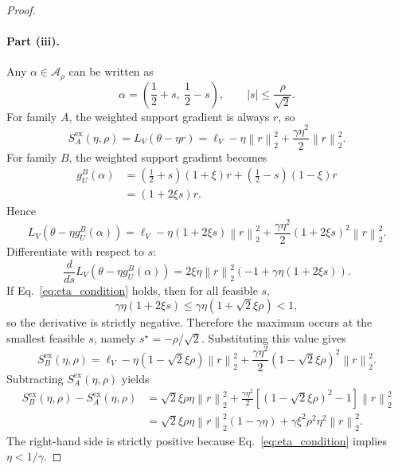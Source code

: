 \documentclass{article}
\newcommand{\norm}[1]{\left\lVert #1 \right\rVert}
\begin{document}
\begin{proof}
\paragraph{Part (iii).}
Any $\alpha \in \mathcal{A}_{\rho}$ can be written as
\begin{equation}
    \alpha = \left(\frac{1}{2}+s,\ \frac{1}{2}-s\right),
    \qquad
    |s| \le \frac{\rho}{\sqrt{2}}.
\end{equation}
For family $A$, the weighted support gradient is always $r$, so
\begin{equation}
    S_A^{\mathrm{ex}}(\eta,\rho)
    =
    L_V(\theta - \eta r)
    =
    \ell_V - \eta \norm{r}_2^2 + \frac{\gamma \eta^2}{2}\norm{r}_2^2.
\end{equation}
For family $B$, the weighted support gradient becomes
\begin{align}
    g_U^B(\alpha)
    &=
    \left(\frac{1}{2}+s\right)(1+\xi)r + \left(\frac{1}{2}-s\right)(1-\xi)r \\
    &=
    (1+2\xi s)r.
\end{align}
Hence
\begin{equation}
    L_V(\theta - \eta g_U^B(\alpha))
    =
    \ell_V - \eta (1+2\xi s)\norm{r}_2^2 + \frac{\gamma \eta^2}{2}(1+2\xi s)^2 \norm{r}_2^2.
\end{equation}
Differentiate with respect to $s$:
\begin{equation}
    \frac{d}{ds}
    L_V(\theta - \eta g_U^B(\alpha))
    =
    2\xi \eta \norm{r}_2^2
    \left(
        -1 + \gamma \eta (1+2\xi s)
    \right).
\end{equation}
If Eq.~\eqref{eq:eta_condition} holds, then for all feasible $s$,
\begin{equation}
    \gamma \eta (1+2\xi s)
    \le
    \gamma \eta (1+\sqrt{2}\xi \rho)
    < 1,
\end{equation}
so the derivative is strictly negative. Therefore the maximum occurs at the smallest feasible $s$, namely $s^\star = -\rho/\sqrt{2}$. Substituting this value gives
\begin{equation}
    S_B^{\mathrm{ex}}(\eta,\rho)
    =
    \ell_V - \eta (1-\sqrt{2}\xi\rho)\norm{r}_2^2 + \frac{\gamma \eta^2}{2}(1-\sqrt{2}\xi\rho)^2 \norm{r}_2^2.
\end{equation}
Subtracting $S_A^{\mathrm{ex}}(\eta,\rho)$ yields
\begin{align}
    S_B^{\mathrm{ex}}(\eta,\rho) - S_A^{\mathrm{ex}}(\eta,\rho)
    &=
    \sqrt{2}\xi\rho \eta \norm{r}_2^2
    +
    \frac{\gamma \eta^2}{2}
    \left[
        (1-\sqrt{2}\xi\rho)^2 - 1
    \right]
    \norm{r}_2^2 \\
    &=
    \sqrt{2}\xi\rho \eta \norm{r}_2^2(1-\gamma\eta)
    +
    \gamma \xi^2 \rho^2 \eta^2 \norm{r}_2^2.
\end{align}
The right-hand side is strictly positive because Eq.~\eqref{eq:eta_condition} implies $\eta < 1/\gamma$.
\end{proof}
\end{document}
